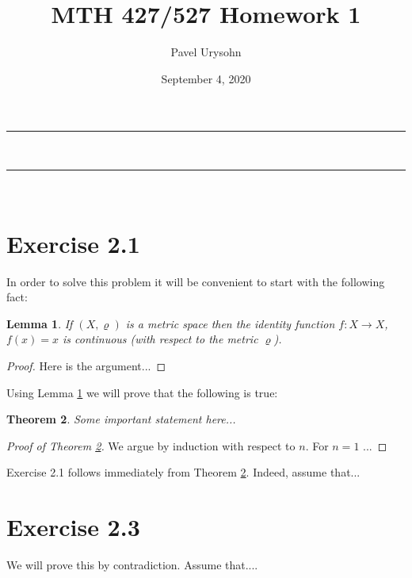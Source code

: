 \documentclass[11pt]{article}
\makeatletter
\newcommand{\nline}{\rule{\linewidth}{0.5pt}}
\theoremstyle{plain}
\newtheorem{theorem}{Theorem}
\newtheorem{lemma}[theorem]{Lemma}
\theoremstyle{definition}
\renewcommand{\maketitle}{
\begin{center}
\nline\\
\vspace{2ex}
{\huge \textsc{\@title}}
\nline\\
{\large\textsc{\@author \hfill \@date}}
\vspace{4ex}
\end{center}
}
\makeatother
\begin{document}
\title{MTH 427/527 Homework 1}

\author{Pavel Urysohn}

\date{September 4, 2020}

\maketitle




\section*{Exercise 2.1}

In order to solve this problem it will be convenient to start with the following fact:

\begin{lemma}
\label{HELPFUL LEMMA}
If $(X, \varrho)$ is a metric space then the identity function $f\colon X \to X$, $f(x) = x$ is continuous
(with respect to the metric $\varrho$). 
\end{lemma}


\begin{proof}
Here is the argument...
\end{proof}

Using Lemma \ref{HELPFUL LEMMA} we will prove that the following is true:

\begin{theorem}
\label{BIG THEOREM}
Some important statement here...
\end{theorem}


\begin{proof}[Proof of Theorem \ref{BIG THEOREM}]
We argue by induction with respect to $n$. For $n=1$ ...
\end{proof}

Exercise 2.1 follows immediately from Theorem \ref{BIG THEOREM}. Indeed, assume that... 



\newpage  %

\section*{Exercise 2.3}

We will prove this by contradiction. Assume that....
\end{document}
